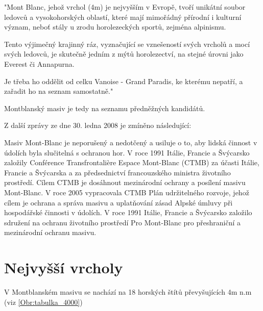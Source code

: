 "Mont Blanc, jehož vrchol (4\:m) je nejvyšším v Evropě, tvoří unikátní soubor ledovců a vysokohorských oblastí, které mají mimořádný přírodní i kulturní význam, neboť stály u zrodu horolezeckých sportů, zejména alpinismu.

Tento výjimečný krajinný ráz, vyznačující se vznešeností svých vrcholů a mocí svých ledovců, je skutečně jedním z mýtů horolezectví, na stejné úrovni jako Everest či Annapurna.

Je třeba ho oddělit od celku Vanoise - Grand Paradis, ke kterému nepatří, a zařadit ho na seznam samostatně."

Montblanský masiv je tedy na seznamu předněžných kandidátů.

Z další zprávy ze dne 30. ledna 2008 je zmíněno následující:

Masiv Mont-Blanc je neporušený a nedotčený a usiluje o to, aby lidská činnost v údolích byla slučitelná s ochranou hor. V roce 1991 Itálie, Francie a Švýcarsko založily Conférence Transfrontalière Espace Mont-Blanc (CTMB) za účasti Itálie, Francie a Švýcarska a za předsednictví francouzského ministra životního prostředí. Cílem CTMB je dosáhnout mezinárodní ochrany a posílení masivu Mont-Blanc. V roce 2005 vypracovala CTMB Plán udržitelného rozvoje, jehož cílem je ochrana a správa masivu a uplatňování zásad Alpské úmluvy při hospodářské činnosti v údolích. V roce 1991 Itálie, Francie a Švýcarsko založilo sdružení na ochranu životního prostředí Pro Mont-Blanc pro přeshraniční a mezinárodní ochranu masivu.


\section{Nejvyšší vrcholy}
V Montblanském masivu se nachází na 18 horských štítů převyšujících 4\:m n.\:m (viz \autoref{Obr:tabulka_4000})


